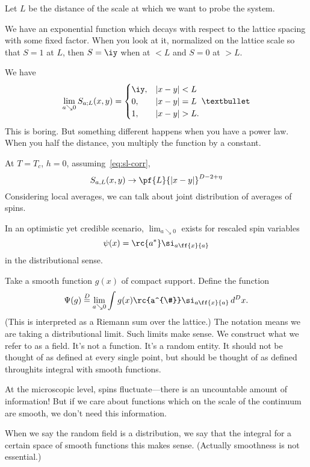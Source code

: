 Let $L$ be the distance of the scale at which we want to probe the system. 


We have an exponential function which decays with respect to the lattice spacing with some fixed factor. When you look at it, normalized on the lattice scale so that $S=1$ at $L$, then $S=\iy$ when at $<L$ and $S=0$ at $>L$.

We have
\[
\lim_{a\searrow 0} S_{a;L} (x,y) =
\begin{cases}
\iy,&|x-y|<L\\
0,&|x-y|=L\\
1, &|x-y|>L.
\end{cases}•
\]
This is boring.
But something different happens when you have a power law. When you half the distance, you multiply the function by a constant.

At $T=T_c$, $h=0$, assuming~\eqref{eq:sl-corr},
\[
S_{a,L}(x,y) \to \pf{L}{|x-y|}^{D-2+\eta}
\]
Considering local averages, we can talk about joint distribution of averages of spins.

In an optimistic yet credible scenario, $\lim_{a\searrow 0}$ exists for rescaled spin variables
\[
\psi(x) = \rc{a^*} \si_{a\ff{x}{a}}
\]
in the distributional sense.

Take a smooth function $g(x)$ of compact support. Define the function 
\[\Psi(g)\stackrel{D}= \lim_{a\searrow 0} \int g(x)\rc{a^{\#}} \si_{a\ff{x}{a}} \,d^Dx.
\]
%
(This is interpreted as a Riemann sum over the lattice.)
The notation means we are taking a distributional limit.
Such limits make sense. We construct what we refer to as a field. It's not a function. It's a random entity. It should not be thought of as defined at every single point, but should be thought of as defined throughits integral with smooth functions.

At the microscopic level, spins fluctuate---there is an uncountable amount of information! But if we care about functions which on the scale of the continuum are smooth, we don't need this information. 

When we say the random field is a distribution, we say that the integral for a certain space of smooth functions this makes sense. (Actually smoothness is not essential.)

